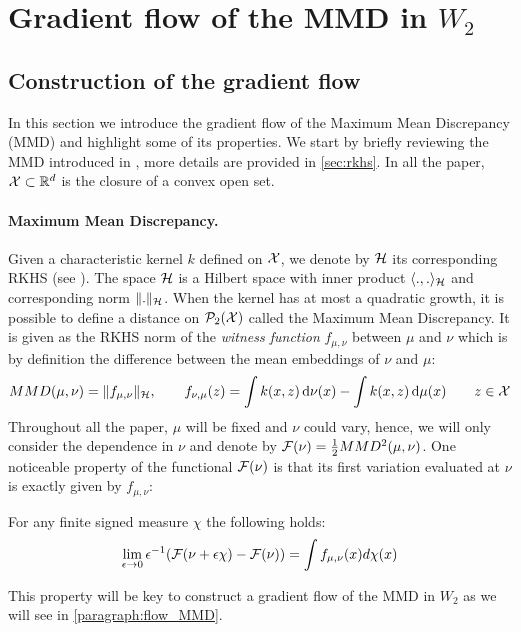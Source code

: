 
\section{Gradient flow of the MMD in $W_2$}\label{sec:gradient_flow}
\subsection{Construction of the gradient flow}
In this section we introduce the gradient flow of the Maximum Mean Discrepancy (MMD) and highlight some of its properties. We start by briefly reviewing the MMD introduced in \cite{gretton2012kernel}, more details are provided in \cref{sec:rkhs}. In all the paper, ${{\mathcal X}}\subset{{\mathbb R}}^d$ is the closure of a convex open set.
\paragraph{Maximum Mean Discrepancy.}\label{subsec:MMD}
Given a characteristic kernel $k$ defined on ${{\mathcal X}}$, we denote by ${{\mathcal H}}$ its corresponding RKHS (see \cite{smola1998learning}). The space ${{\mathcal H}}$ is a Hilbert space with inner product $\langle .,. \rangle_{{{\mathcal H}}}$ and corresponding norm $\Vert . \Vert_{{{\mathcal H}}}$.
When the kernel has at most a quadratic growth, it is possible to define a distance on $\mathcal{P}_2({{\mathcal X}})$ called the Maximum Mean Discrepancy. It is given as the RKHS norm of the \textit{witness function} $f_{\mu,\nu}$ between $\mu$ and $\nu$ which is by definition the difference between the mean embeddings of $\nu$ and $\mu$: 
\begin{align}\label{eq:witness_function}
MMD(\mu,\nu) = \Vert f_{\mu,\nu} \Vert_{{{\mathcal H}}}, \qquad f_{\nu,\mu}(z) = \int k(x,z)\mathop{}\!\mathrm{d} \nu(x) - \int k(x,z)\mathop{}\!\mathrm{d} \mu(x)  \qquad z\in {{\mathcal X}}
\end{align}
Throughout all the paper, $\mu$ will be fixed and $\nu$ could vary, hence, we will only consider the dependence in $\nu$ and denote by ${{\mathcal F}}(\nu)= \frac{1}{2}MMD^2(\mu,\nu)$. One noticeable property of the functional ${{\mathcal F}}(\nu)$ is that its first variation evaluated at $\nu$ is exactly given by $f_{\mu,\nu}$:
\begin{proposition}\label{prop:differential_mmd}
	For any finite signed measure $\chi$ the following holds:
	\begin{align}
		\lim_{\epsilon\rightarrow 0} \epsilon^{-1}({{\mathcal F}}(\nu +\epsilon\chi) - {{\mathcal F}}(\nu)) = \int f_{\mu,\nu}(x)d\chi(x) 
	\end{align}
\end{proposition}
This property will be key to construct a gradient flow of the MMD in $W_2$ as we will see in \cref{paragraph:flow_MMD}.
